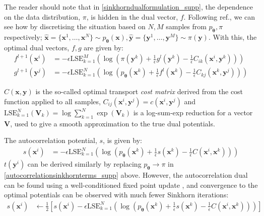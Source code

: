 The reader should note that in \eqref{sinkhorndualformulation_supp}, the dependence on the data distribution, $\pi$, is hidden in the dual vector, $f$. Following ref., we can see how by discretising the situation based on $N, M$ samples from $p_{\boldsymbol\theta}, \pi$ respectively; $ \hat{\mathbf{x}} = \{\mathbf{x}^1, \dots, \mathbf{x}^N\}\sim p_{\boldsymbol\theta}(\mathbf{x}),  \hat{\mathbf{y}} =\{\mathbf{y}^1, \dots, \mathbf{y}^M\} \sim \pi(\mathbf{y})$. With this, the optimal dual vectors, $f, g$ are given by:
\begin{align}
    f^{l+1}(\mathbf{x}^i) &= -\epsilon \text{LSE}_{k=1}^M\left(\log\left(\pi(\mathbf{\mathbf{y}}^k) + \frac{1}{\epsilon}g^{l}(\mathbf{y}^k) - \frac{1}{\epsilon} C_{ik}(\mathbf{x}^i, \mathbf{y}^k)\right)\right)\\
    g^{l+1}(\mathbf{y}^j) &= -\epsilon \text{LSE}_{k=1}^N\left(\log\left(p_{\boldsymbol\theta}(\mathbf{x}^k) + \frac{1}{\epsilon}f^{l}(\mathbf{x}^k) - \frac{1}{\epsilon} C_{kj}(\mathbf{x}^k, \mathbf{y}^j)\right)\right) \label{sinkhorndualvectors_supp}
\end{align}



$C(\mathbf{x}, \mathbf{y})$ is the so-called optimal transport \textit{cost matrix} derived from the cost function applied to all samples, $C_{ij}(\mathbf{x}^i, \mathbf{y}^j) = c(\mathbf{x}^i, \mathbf{y}^j)$ and $\text{LSE}_{k=1}^N(\mathbf{V}_k) = \log\sum\limits_{k=1}^N\exp(\mathbf{V}_k)$ is a log-sum-exp reduction for a vector $\mathbf{V}$, used to give a smooth approximation to the true dual potentials.

The autocorrelation potential, $s$, is given by:
\begin{align}
    s(\mathbf{x}^i) &= -\epsilon \text{LSE}_{k=1}^N\left(\log\left(p_{\boldsymbol\theta}(\mathbf{\mathbf{x}}^k) + \frac{1}{\epsilon}s(\mathbf{x}^k) - \frac{1}{\epsilon} C(\mathbf{x}^i, \mathbf{x}^k)\right)\right) \label{autocorrelationsinkhornterms_supp}
\end{align}
$t(\mathbf{y}^i)$ can be derived similarly by replacing $p_{\boldsymbol\theta} \rightarrow \pi$ in \eqref{autocorrelationsinkhornterms_supp} above. However, the autocorrelation dual can be found using a well-conditioned fixed point update , and convergence to the optimal potentials can be observed with much fewer Sinkhorn iterations:
\begin{align}
    s(\mathbf{x}^i) &\leftarrow \frac{1}{2}\left[s(\mathbf{x}^i)-\epsilon \text{LSE}_{k=1}^N\left(\log\left(p_{\boldsymbol\theta}(\mathbf{x}^k) + \frac{1}{\epsilon}s(\mathbf{x}^k) - \frac{1}{\epsilon} C(\mathbf{x}^i, \mathbf{x}^k)\right)\right)\right] \label{autocorrelationsinkhorntermsupdate_supp}
\end{align}

